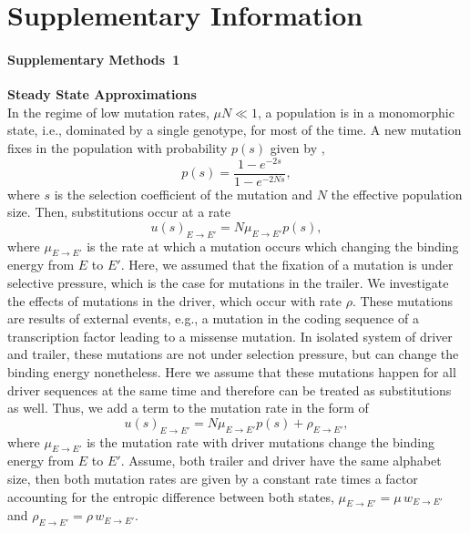 \documentclass[10pt,a4paper]{article}
\begin{document}
\clearpage
\section*{Supplementary Information}

\paragraph*{Supplementary Methods~1}
\label{supp1}
\textbf{Steady State Approximations}\\

\noindent In the regime of low mutation rates, $\mu N\ll1$, a population is in a monomorphic state, i.e., dominated by a single genotype, 
for most of the time. A new mutation fixes in the population with probability $p(s)$ given by \cite{kimura_probability_1962},
\begin{equation}
p(s) = \frac{1-e^{-2s}}{1-e^{-2Ns}},
\end{equation}
where $s$ is the selection coefficient of the mutation and $N$ the effective population size. Then, substitutions occur at a rate
\begin{equation}
u(s)_{E\rightarrow E'} = N\mu_{E\rightarrow E'}p(s),
\end{equation}
where $\mu_{E\rightarrow E'}$ is the rate at which a mutation occurs which changing the binding energy from $E$ to $E'$. Here, we assumed that the fixation 
of a mutation is under selective pressure, which is the case for mutations in the trailer. We investigate the effects of mutations in the driver, which occur 
with rate $\rho$. These mutations are results of external events, e.g., a mutation in the coding sequence of a transcription factor leading to a missense mutation. 
In isolated system of driver and trailer, these mutations are not under selection pressure, but can change the binding energy nonetheless. 
Here we assume that these mutations happen for all driver sequences at the same time and therefore can be treated as substitutions as well. 
Thus, we add a term to the mutation rate in the form of
\begin{equation}
u(s)_{E\rightarrow E'}=   N\mu_{E\rightarrow E'}p(s) + \rho_{E\rightarrow E'},
\end{equation}
where $\mu_{E\rightarrow E'}$ is the mutation rate with driver mutations change the binding energy from $E$ to $E'$.
Assume, both trailer and driver have the same alphabet size, then both mutation rates are given by a constant rate times a factor accounting for 
the entropic difference between both states, $\mu_{E\rightarrow E'}=\mu\,w_{E\rightarrow E'}$ and $\rho_{E\rightarrow E'}=\rho\,w_{E\rightarrow E'}$. 
\end{document}
